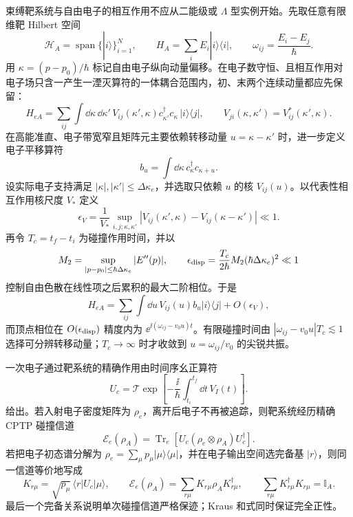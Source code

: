 束缚靶系统与自由电子的相互作用不应从二能级或 $\Lambda$ 型实例开始。先取任意有限维靶 Hilbert 空间
\begin{equation*}
\mathcal H_A=\operatorname{span}\{|i\rangle\}_{i=1}^{N},
\qquad H_A=\sum_iE_i|i\rangle\langle i|,
\qquad \omega_{ij}=\frac{E_i-E_j}{\hbar}.
\end{equation*}
用 $\kappa=(p-p_0)/\hbar$ 标记自由电子纵向动量偏移。在电子数守恒、且相互作用对电子场只含一产生一湮灭算符的一体耦合范围内，初、末两个连续动量都应先保留：
\begin{equation*}
H_{eA}
=\sum_{ij}\int\dd \kappa\,\dd \kappa'\,
V_{ij}(\kappa',\kappa)c_{\kappa'}^\dagger c_\kappa\,|i\rangle\langle j|,
\qquad
V_{ji}(\kappa,\kappa')=V_{ij}^*(\kappa',\kappa).
\end{equation*}
在高能准直、电子带宽窄且矩阵元主要依赖转移动量 $u=\kappa-\kappa'$ 时，进一步定义电子平移算符
\begin{equation*}
b_u=\int\dd \kappa\,c_\kappa^\dagger c_{\kappa+u}.
\end{equation*}
设实际电子支持满足 $|\kappa|,|\kappa'|\le\Delta\kappa_e$，并选取只依赖 $u$ 的核 $V_{ij}(u)$。以代表性相互作用核尺度 $V_*$ 定义
\begin{equation*}
 \epsilon_V
 =\frac{1}{V_*}
 \sup_{i,j;\kappa,\kappa'}
 |V_{ij}(\kappa',\kappa)-V_{ij}(\kappa-\kappa')|\ll1.
\end{equation*}
再令 $T_c=t_f-t_i$ 为碰撞作用时间，并以
\begin{equation*}
 M_2=\sup_{|p-p_0|\le\hbar\Delta\kappa_e}|E''(p)|,
 \qquad
 \epsilon_{\rm disp}
 =\frac{T_c}{2\hbar}M_2(\hbar\Delta\kappa_e)^2\ll1
\end{equation*}
控制自由色散在线性项之后累积的最大二阶相位。于是
\begin{equation*}
 H_{eA}
 =\sum_{ij}\int\dd u\,V_{ij}(u)b_u|i\rangle\langle j|
 +O(\epsilon_V),
\end{equation*}
而顶点相位在 $O(\epsilon_{\rm disp})$ 精度内为 $\ee^{\ii(\omega_{ij}-v_0u)t}$。有限碰撞时间由 $|\omega_{ij}-v_0u|T_c\lesssim1$ 选择可分辨转移动量；$T_c\to\infty$ 时才收敛到 $u=\omega_{ij}/v_0$ 的尖锐共振。

一次电子通过靶系统的精确作用由时间序幺正算符
\begin{equation}
\boxed{
U_c=\mathcal T\exp\!\left[-\frac{\ii}{\hbar}\int_{t_i}^{t_f}\dd t\,V_I(t)\right].}
\label{eq:general_collision_exact_unitary}
\end{equation}
给出。若入射电子密度矩阵为 $\rho_e$，离开后电子不再被追踪，则靶系统经历精确 CPTP 碰撞信道
\begin{equation}
\boxed{
\mathscr E_e(\rho_A)
=\operatorname{Tr}_e[U_c(\rho_e\otimes\rho_A)U_c^\dagger].}
\label{eq:general_electron_target_cptp_map}
\end{equation}
若把电子初态谱分解为 $\rho_e=\sum_\mu p_\mu|\mu\rangle\langle\mu|$，并在电子输出空间选完备基 $|r\rangle$，则同一信道等价地写成
\begin{equation}
\boxed{
K_{r\mu}=\sqrt{p_\mu}\,\langle r|U_c|\mu\rangle,
\qquad
\mathscr E_e(\rho_A)=\sum_{r\mu}K_{r\mu}\rho_AK_{r\mu}^\dagger,
\qquad
\sum_{r\mu}K_{r\mu}^\dagger K_{r\mu}=\mathbb I_A.}
\label{eq:general_collision_kraus_representation}
\end{equation}
最后一个完备关系说明单次碰撞信道严格保迹；Kraus 和式同时保证完全正性。

